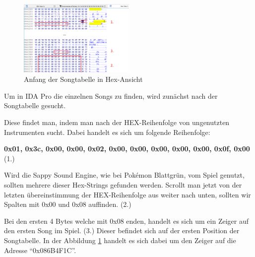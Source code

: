 \documentclass[11pt,a4paper]{scrartcl}
\begin{document}
\vspace{15pt}

\begin{figure}
	\vspace{-10pt}
	\begin{center}
		\includegraphics[width=0.5\textwidth]{Songtabelle}
	\end{center}
	\vspace{-10pt}
	\caption{Anfang der Songtabelle in Hex-Ansicht}
	\label{fig:hex-view}
	\vspace{-30pt}
\end{figure}

Um in IDA Pro die einzelnen Songs zu finden, wird zun\"achst nach der Songtabelle gesucht.

Diese findet man, indem man nach der HEX-Reihenfolge von ungenutzten Instrumenten sucht. Dabei handelt es sich um folgende Reihenfolge: 

\textbf{0x01, 0x3c, 0x00, 0x00, 0x02, 0x00, 0x00, 0x00, 0x00, 0x00, 0x0f, 0x00} (1.)

Wird die Sappy Sound Engine, wie bei Pok\'{e}mon Blattgr\"un, vom Spiel genutzt, sollten mehrere dieser Hex-Strings gefunden werden.
Scrollt man jetzt von der letzten \"ubereinstimmung der HEX-Reihenfolge aus weiter nach unten, sollten wir Spalten mit 0x00 und 0x08 auffinden. (2.)

Bei den ersten 4 Bytes welche mit 0x08 enden, handelt es sich um ein Zeiger auf den ersten Song im Spiel. (3.) Dieser befindet sich auf der ersten Position der Songtabelle. 
In der Abbildung \ref{fig:hex-view} handelt es sich dabei um den Zeiger auf die Adresse "`0x086B4F1C"'.

\vspace{15pt}
\end{document}
